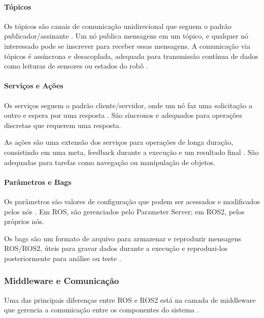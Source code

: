 \paragraph{Tópicos}

Os tópicos são canais de comunicação unidirecional que seguem o padrão publicador/assinante \cite{Quigley2009, Joseph2018}. Um nó publica mensagens em um tópico, e qualquer nó interessado pode se inscrever para receber essas mensagens. A comunicação via tópicos é assíncrona e desacoplada, adequada para transmissão contínua de dados como leituras de sensores ou estados do robô \cite{Macenski2022}.

\paragraph{Serviços e Ações}

Os serviços seguem o padrão cliente/servidor, onde um nó faz uma solicitação a outro e espera por uma resposta \cite{Quigley2009, Joseph2018}. São síncronos e adequados para operações discretas que requerem uma resposta.

As ações são uma extensão dos serviços para operações de longa duração, consistindo em uma meta, feedback durante a execução e um resultado final \cite{Joseph2018, Macenski2022}. São adequadas para tarefas como navegação ou manipulação de objetos.

\paragraph{Parâmetros e Bags}

Os parâmetros são valores de configuração que podem ser acessados e modificados pelos nós \cite{Quigley2009, Joseph2018}. Em ROS, são gerenciados pelo Parameter Server; em ROS2, pelos próprios nós.

Os bags são um formato de arquivo para armazenar e reproduzir mensagens ROS/ROS2, úteis para gravar dados durante a execução e reproduzi-los posteriormente para análise ou teste \cite{Quigley2009, Joseph2018}.

\subsubsection{Middleware e Comunicação}

Uma das principais diferenças entre ROS e ROS2 está na camada de middleware que gerencia a comunicação entre os componentes do sistema \cite{Macenski2022, ROS2Design2024}.

